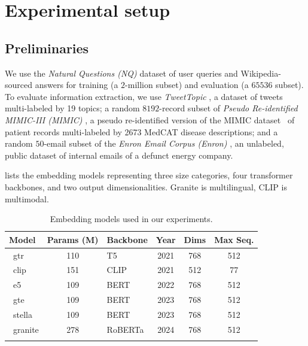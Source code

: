 \section{Experimental setup}
\label{sec:setup}

\subsection{Preliminaries}
\label{sec:prelims}

We use the \textit{Natural Questions (NQ)} \cite{kwiatkowski-etal-2019-natural} dataset of user queries and Wikipedia-sourced answers for training (a $2$-million subset) and evaluation (a $65536$ subset).  To evaluate information extraction, we use
\textit{TweetTopic} \cite{antypas-etal-2024-multilingual}, a dataset of tweets multi-labeled by 19 topics; a random $8192$-record subset of
\textit{Pseudo Re-identified MIMIC-III (MIMIC)} \cite{lehman-etal-2021-bert}, a pseudo re-identified version of the MIMIC dataset~\cite{johnson2016mimic} of patient records multi-labeled by 2673 MedCAT \cite{kraljevic2021multi} disease descriptions; and a random $50$-email subset of
the \textit{Enron Email Corpus (Enron)} \cite{10.1007/978-3-540-30115-8_22}, an unlabeled, public dataset of
internal emails of a defunct energy company.

  lists the embedding models representing three size categories, four transformer backbones, and two output dimensionalities.  Granite is multilingual, CLIP is multimodal.

\begin{table}[ht]
  \scriptsize
  \centering
  \begin{tabular}{lclccc}
    \toprule
    Model    & Params (M) & Backbone & Year & Dims & Max Seq. \\
    \midrule
    \citep{ni2021gtr} \ gtr      & 110     & T5 & 2021 & 768 & 512  \\
    \citep{radford2021clip} \ clip    & 151     & CLIP & 2021 & 512 & 77  \\
    \citep{wang2024e5} \ e5     & 109     & BERT & 2022 & 768 & 512 \\
    \citep{li2023gte} \ gte    & 109     & BERT & 2023 & 768 & 512 \\
    \citep{zhang2025stella} \ stella & 109     & BERT & 2023 & 768 & 512 \\
    \citep{granite2024embedding} \ granite  & 278     & RoBERTa & 2024 & 768 & 512 \\
    \bottomrule\\[-1.6ex]
  \end{tabular}
  \caption{Embedding models used in our experiments.}
  \label{tab:model-specs}
\end{table}

